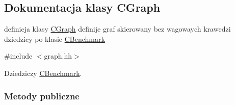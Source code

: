 \hypertarget{class_c_graph}{}\subsection{Dokumentacja klasy C\+Graph}
\label{class_c_graph}


definicja klasy \hyperlink{class_c_graph}{C\+Graph} definije graf skierowany bez wagowaych krawedzi dziedzicy po klasie \hyperlink{class_c_benchmark}{C\+Benchmark}  




{\ttfamily \#include $<$graph.\+hh$>$}



Dziedziczy \hyperlink{class_c_benchmark}{C\+Benchmark}.

\subsubsection*{Metody publiczne}
